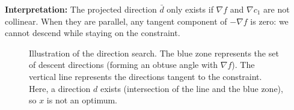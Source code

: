 \begin{figureexplanation}
\textbf{Interpretation:} The projected direction $\bar{d}$ only exists if $\nabla f$ and $\nabla c_1$ are not collinear. When they are parallel, any tangent component of $-\nabla f$ is zero: we cannot descend while staying on the constraint.
\end{figureexplanation}

\begin{figure}[H]
\centering
{}
\caption{Illustration of the direction search. The blue zone represents the set of descent directions (forming an obtuse angle with $\nabla f$). The vertical line represents the directions tangent to the constraint. Here, a direction $d$ exists (intersection of the line and the blue zone), so $x$ is not an optimum.}
\label{fig:direction-finding}
\end{figure}

